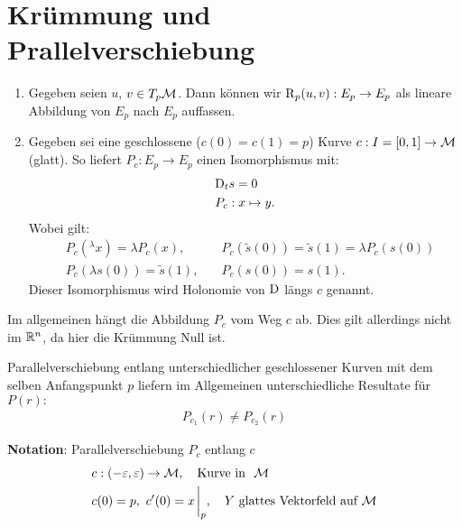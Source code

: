 \section{Krümmung und Prallelverschiebung}
\begin{enumerate}
\item Gegeben seien $u$, $v \in T_p \mathcal{M}$.
Dann können wir $\operatorname{R}_p (u, v) : E_p \to E_p$ als lineare Abbildung von $E_p$ nach $E_p$ auffassen.
\item Gegeben sei eine geschlossene ($c(0)= c(1) = p$) Kurve $c : I=[ 0, 1 ] \to \mathcal{M}$ (glatt).
So liefert $P_c : E_p \to E_p$ einen Isomorphismus mit:
\begin{align}
&\mathrm{D}_t s = 0\\
&P_c : x \mapsto y.
\end{align}
Wobei gilt:
\begin{align}
&P_c (^\lambda x) = \lambda P_c (x), \quad &P_c (\tilde{s}(0)) = \tilde{s}(1) = \lambda P_c(s(0))\\
&P_c(\lambda s(0)) = \tilde{s}(1), \quad & P_c (s(0)) = s(1).
\end{align}
Dieser Isomorphismus wird Holonomie von $\mathrm{D}$ längs $c$ genannt.
\end{enumerate}
\begin{bem}
Im allgemeinen hängt die Abbildung $P_c$ vom Weg $c$ ab. 
Dies gilt allerdings nicht im $\mathbb{R}^n$, da hier die Krümmung Null ist.
\end{bem}
Parallelverschiebung entlang unterschiedlicher geschlossener Kurven mit dem selben Anfangspunkt $p$ liefern im Allgemeinen unterschiedliche Resultate für $P(r): $
\begin{align}
P_{c_1} (r) \neq P_{c_2}(r)
\end{align}

\textbf{Notation}:
Parallelverschiebung $P_c$ entlang $c$
\begin{align}
& c: (-\epsilon, \epsilon) \to \mfk, \quad \text{Kurve in } \ \mfk \\
&c(0)= p, \ c'(0) = x \eval_p, \quad Y \ \text{glattes Vektorfeld auf} \  \mfk
\end{align}


